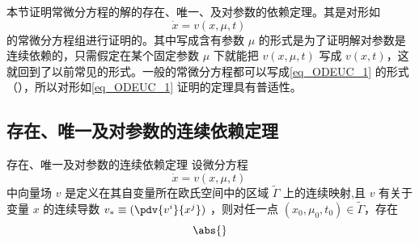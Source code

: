 
本节证明常微分方程的解的存在、唯一、及对参数的依赖定理。其是对形如
\begin{equation}\label{eq_ODEUC_1}
\dot x=v(x,\mu,t)~
\end{equation}
的常微分方程组进行证明的。其中写成含有参数 $\mu$ 的形式是为了证明解对参数是连续依赖的，只需假定在某个固定参数 $\mu$ 下就能把 $v(x,\mu,t)$ 写成 $v(x,t)$，这就回到了以前常见的形式。一般的常微分方程都可以写成\autoref{eq_ODEUC_1} 的形式（），所以对形如\autoref{eq_ODEUC_1} 证明的定理具有普适性。
\subsection{存在、唯一及对参数的连续依赖定理}
\begin{theorem}{存在、唯一及对参数的连续依赖定理}
设微分方程
\begin{equation}
\dot x=v(x,\mu,t)~
\end{equation}
中向量场 $v$ 是定义在其自变量所在欧氏空间中的区域 $\tilde\Gamma$ 上的连续映射,且 $v$ 有关于变量 $x$ 的连续导数 $v_*\equiv(\pdv{v^i}{x^j})$ ，则对任一点 $(x_0,\mu_0,t_0)\in\tilde\Gamma$，存在
\begin{equation}
\abs{}
\end{equation}

\end{theorem}

